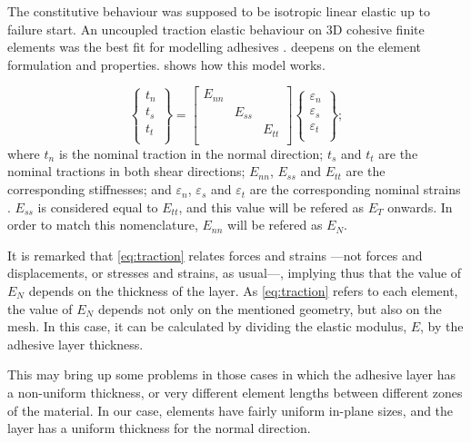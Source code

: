 \documentclass[cmfonts]{witpress}
\begin{document}
The constitutive behaviour was supposed to be isotropic linear elastic \cite{SernaMoreno2015} up to failure start. An uncoupled traction elastic behaviour \cite{Sadowski2010, Sadowski2011, Scattina2011, Sadowski2014} on 3D cohesive finite elements was the best fit for modelling adhesives \cite{Abaqus613Manual}.  deepens on the element formulation and properties.  shows how this model works.

\begin{equation}
\begin{Bmatrix}
t_n \\
t_s \\
t_t \\
\end{Bmatrix}
=
\begin{bmatrix}
E_{nn} & & \\
& E_{ss} & \\
& & E_{tt} \\
\end{bmatrix}
\begin{Bmatrix}
\varepsilon_n \\
\varepsilon_s \\
\varepsilon_t \\
\end{Bmatrix} ;
\label{eq:traction}
\end{equation}
where $t_n$ is the nominal traction in the normal direction; $t_s$ and $t_t$ are the nominal tractions in both shear directions; $E_{nn}$, $E_{ss}$ and $E_{tt}$ are the corresponding stiffnesses; and $\varepsilon_n$, $\varepsilon_s$ and $\varepsilon_t$ are the corresponding nominal strains \cite{Abaqus613Manual}. $E_{ss}$ is considered equal to $E_{tt}$, and this value will be refered as $E_{T}$ onwards. In order to match this nomenclature, $E_{nn}$ will be refered as $E_{N}$.

It is remarked that \cref{eq:traction} relates forces and strains ---not forces and displacements, or stresses and strains, as usual---, implying thus that the value of $E_{N}$ depends on the thickness of the layer. As \cref{eq:traction} refers to each element, the value of $E_{N}$ depends not only on the mentioned geometry, but also on the mesh. In this case, it can be calculated by dividing the elastic modulus, $E$, by the adhesive layer thickness.

This may bring up some problems in those cases in which the adhesive layer has a non-uniform thickness, or very different element lengths between different zones of the material. In our case, elements have fairly uniform in-plane sizes, and the layer has a uniform thickness for the normal direction.
\end{document}
